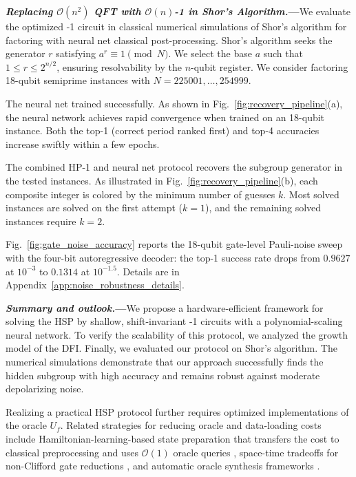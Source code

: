\documentclass[reprint, aps, prl, superscriptaddress]{revtex4-2}
\renewcommand{\section}[1]{\par\medskip\noindent\textbf{{\textit{#1.}---}}}
\newcommand{\myqc}{\text{HP}}
\begin{document}
\section{Replacing \texorpdfstring{$\mathcal{O}(n^2)$}{O(n2)} QFT with \texorpdfstring{$\mathcal{O}(n)$}{O(n)}\myqc{}-1 in Shor's Algorithm}We evaluate the optimized \myqc{}-1 circuit in classical numerical simulations of Shor's algorithm for factoring with neural net classical post-processing. Shor's algorithm seeks the generator $r$ satisfying $a^r \equiv 1 \pmod{N}$. We select the base $a$ such that $1 \le r \le 2^{n/2}$, ensuring resolvability by the $n$-qubit register. We consider factoring 18-qubit semiprime instances with \(N=225001,\ldots,254999\).

The neural net trained successfully. As shown in Fig.~\ref{fig:recovery_pipeline}(a), the neural network achieves rapid convergence when trained on an 18-qubit instance. Both the top-1 (correct period ranked first) and top-4 accuracies increase swiftly within a few epochs.

The combined HP-1 and neural net protocol recovers the subgroup generator in the tested instances. As illustrated in Fig.~\ref{fig:recovery_pipeline}(b), each composite integer is colored by the minimum number of guesses $k$. Most solved instances are solved on the first attempt ($k=1$), and the remaining solved instances require $k=2$. 

Fig.~\ref{fig:gate_noise_accuracy} reports the 18-qubit gate-level Pauli-noise sweep with the four-bit autoregressive decoder: the top-1 success rate drops from \(0.9627\) at \(10^{-3}\) to \(0.1314\) at \(10^{-1.5}\). Details are in Appendix~\ref{app:noise_robustness_details}.

\section{Summary and outlook}We propose a hardware-efficient framework for solving the HSP by shallow, shift-invariant \myqc{}-1 circuits with a polynomial-scaling neural network. To verify the scalability of this protocol, we analyzed the growth model of the DFI. Finally, we evaluated our protocol on Shor's algorithm. The numerical simulations demonstrate that our approach successfully finds the hidden subgroup with high accuracy and remains robust against moderate depolarizing noise.

Realizing a practical HSP protocol further requires optimized implementations of the oracle $U_f$.
Related strategies for reducing oracle and data-loading costs include Hamiltonian-learning-based state preparation that transfers the cost to classical preprocessing and uses \(\mathcal{O}(1)\) oracle queries \cite{learning_hamiltonian_2025}, space-time tradeoffs for non-Clifford gate reductions \cite{yu2025back}, and automatic oracle synthesis frameworks \cite{aos_qdk_2024}. 
\end{document}
